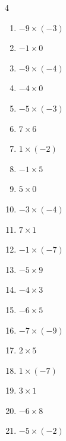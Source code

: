 \begin{multicols}{4}
\begin{enumerate}
  \item $-9\times (-3)$
        \phantom{$=27$}

  \item $-1\times 0$
        \phantom{$=0$}

\columnbreak %

  \item $-9\times (-4)$
        \phantom{$=36$}

  \item $-4\times 0$
        \phantom{$=0$}

  \item $-5\times (-3)$
        \phantom{$=15$}

  \item $7\times 6$
        \phantom{$=42$}

  \item $1\times (-2)$
        \phantom{$=-2$}

  \item $-1\times 5$
        \phantom{$=-5$}

  \item $5\times 0$
        \phantom{$=0$}

  \item $-3\times (-4)$
        \phantom{$=12$}

  \item $7\times 1$
        \phantom{$=7$}

  \item $-1\times (-7)$
        \phantom{$=7$}

  \item $-5\times 9$
        \phantom{$=-45$}

  \item $-4\times 3$
        \phantom{$=-12$}

  \item $-6\times 5$
        \phantom{$=-30$}

  \item $-7\times (-9)$
        \phantom{$=63$}

  \item $2\times 5$
        \phantom{$=10$}

  \item $1\times (-7)$
        \phantom{$=-7$}

  \item $3\times 1$
        \phantom{$=3$}

  \item $-6\times 8$
        \phantom{$=-48$}

  \item $-5\times (-2)$
        \phantom{$=10$}


\end{enumerate}
\end{multicols}
